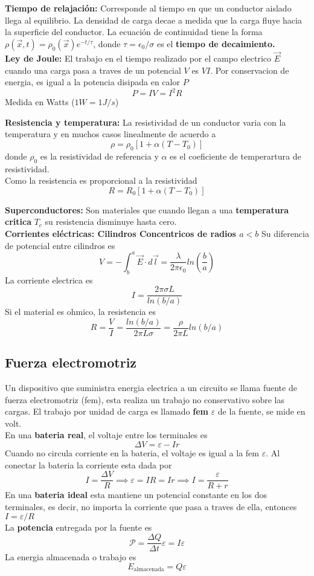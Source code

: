\documentclass[a4paper, 10pt]{article}
\begin{document}
\begin{multicols*}{2}
	\textbf{Tiempo de relajación:} Corresponde al tiempo en que un conductor aislado llega al equilibrio. La densidad de carga decae a medida que la carga fluye hacia la superficie del conductor.
	La ecuación de continuidad tiene la forma $\rho(\vec{x}, t) = \rho_0(\vec{x})e^{-t/\tau}$, donde $\tau =\epsilon_0/\sigma$ es el \textbf{tiempo de decaimiento.}\\
	    
	\textbf{Ley de Joule: }El trabajo en el tiempo realizado por el campo electrico $\vec{E}$ cuando una carga pasa a traves de un potencial $V$ es $VI$. Por conservacion de energia, es igual a la potencia disipada en calor $P$
	$$P = I V = I^2 R$$
	Medida en Watts ($1 W = 1 J/s$)
	    
	\textbf{Resistencia y temperatura: }La resistividad de un conductor varia con la temperatura y en muchos casos linealmente de acuerdo a $$\rho = \rho_0 [1+\alpha (T-T_0)]$$
	donde $\rho_0$ es la resistividad de referencia y $\alpha$ es el coeficiente de temperartura de resistividad.\\
	Como la resistencia es proporcional a la resistividad
	$$R=R_0[1+\alpha(T-T_0)]$$
	    
	\textbf{Superconductores: }Son materiales que cuando llegan a una \textbf{temperatura critica} $T_c$ su resistencia disminuye hasta cero.\\
	    
	\textbf{Corrientes eléctricas: Cilindros Concentricos de radios $a<b$}
	Su diferencia de potencial entre cilindros es $$V=-\int_b^a\vec{E}\cdot d\vec{l}=\frac{\lambda}{2 \pi \epsilon_0}ln(\frac{b}{a})$$
	La corriente electrica es 
	$$I=\frac{2\pi \sigma L}{ln(b/a)}$$
	Si el material es ohmico, la resistencia es
	$$R=\frac{V}{I}=\frac{ln(b/a)}{2\pi L \sigma}=\frac{\rho}{2 \pi L}ln(b/a)$$
	    
	\subsection{Fuerza electromotriz}
	Un dispositivo que suministra energia electrica a un circuito se llama fuente de fuerza electromotriz (fem), esta realiza un trabajo no conservativo sobre las cargas. El trabajo por unidad de carga es llamado \textbf{fem} $\varepsilon$ de la fuente, se mide en volt.\\
	En una \textbf{bateria real}, el voltaje entre los terminales es 
	$$\Delta V=\varepsilon -Ir$$
	Cuando no circula corriente en la bateria, el voltaje es igual a la fem $\varepsilon$. Al conectar la bateria la corriente esta dada por
	$$I=\frac{\Delta V}{R} \implies \varepsilon=IR=Ir \implies I=\frac{\varepsilon}{R+r}$$
	En una \textbf{bateria ideal} esta mantiene un potencial constante en los dos terminales, es decir, no importa la corriente que pasa a traves de ella, entonces $I=\varepsilon/R$\\
	La \textbf{potencia} entregada por la fuente es
	$$\mathcal{P}=\frac{\Delta Q}{\Delta t}\varepsilon=I\varepsilon$$
	La energia almacenada o trabajo es
	$$E_{\text{almacenada}}=Q\varepsilon$$
	    

\end{multicols*}
\end{document}
